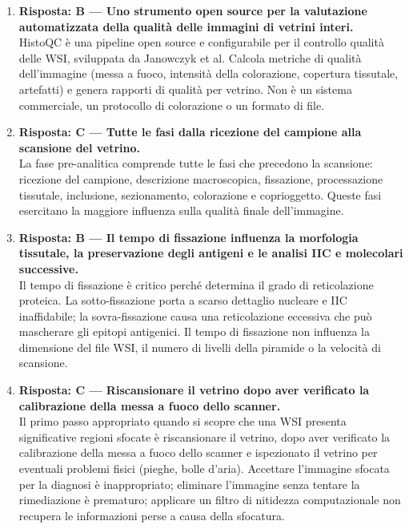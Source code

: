 \begin{enumerate}
    \item \textbf{Risposta: B --- Uno strumento open source per la valutazione automatizzata della
    qualità delle immagini di vetrini interi.}\\
    HistoQC è una pipeline open source e configurabile per il controllo qualità delle WSI,
    sviluppata da Janowczyk et al. Calcola metriche di qualità dell'immagine (messa a fuoco,
    intensità della colorazione, copertura tissutale, artefatti) e genera rapporti di qualità per
    vetrino. Non è un sistema commerciale, un protocollo di colorazione o un formato di file.

    \item \textbf{Risposta: C --- Tutte le fasi dalla ricezione del campione alla scansione del
    vetrino.}\\
    La fase pre-analitica comprende tutte le fasi che precedono la scansione: ricezione del
    campione, descrizione macroscopica, fissazione, processazione tissutale, inclusione,
    sezionamento, colorazione e coprioggetto. Queste fasi esercitano la maggiore influenza sulla
    qualità finale dell'immagine.

    \item \textbf{Risposta: B --- Il tempo di fissazione influenza la morfologia tissutale, la
    preservazione degli antigeni e le analisi IIC e molecolari successive.}\\
    Il tempo di fissazione è critico perché determina il grado di reticolazione proteica. La
    sotto-fissazione porta a scarso dettaglio nucleare e IIC inaffidabile; la sovra-fissazione
    causa una reticolazione eccessiva che può mascherare gli epitopi antigenici. Il tempo di
    fissazione non influenza la dimensione del file WSI, il numero di livelli della piramide o
    la velocità di scansione.

    \item \textbf{Risposta: C --- Riscansionare il vetrino dopo aver verificato la calibrazione
    della messa a fuoco dello scanner.}\\
    Il primo passo appropriato quando si scopre che una WSI presenta significative regioni sfocate
    è riscansionare il vetrino, dopo aver verificato la calibrazione della messa a fuoco dello
    scanner e ispezionato il vetrino per eventuali problemi fisici (pieghe, bolle d'aria). Accettare
    l'immagine sfocata per la diagnosi è inappropriato; eliminare l'immagine senza tentare la
    rimediazione è prematuro; applicare un filtro di nitidezza computazionale non recupera le
    informazioni perse a causa della sfocatura.


\end{enumerate}
